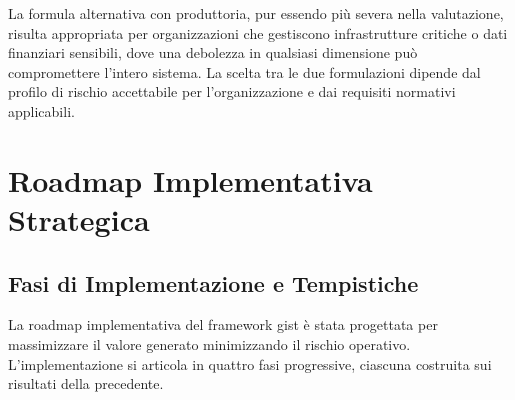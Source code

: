La formula alternativa con produttoria, pur essendo più severa nella valutazione, risulta appropriata per organizzazioni che gestiscono infrastrutture critiche o dati finanziari sensibili, dove una debolezza in qualsiasi dimensione può compromettere l'intero sistema. La scelta tra le due formulazioni dipende dal profilo di rischio accettabile per l'organizzazione e dai requisiti normativi applicabili.

\section{\texorpdfstring{Roadmap Implementativa Strategica}{5.4 - Roadmap Implementativa Strategica}}
\label{sec:5.4}

\subsection{\texorpdfstring{Fasi di Implementazione e Tempistiche}{5.4.1 - Fasi di Implementazione e Tempistiche}}
\label{subsec:5.4.1}

La roadmap implementativa del framework \gls{gist} è stata progettata per massimizzare il valore generato minimizzando il rischio operativo. L'implementazione si articola in quattro fasi progressive, ciascuna costruita sui risultati della precedente.

